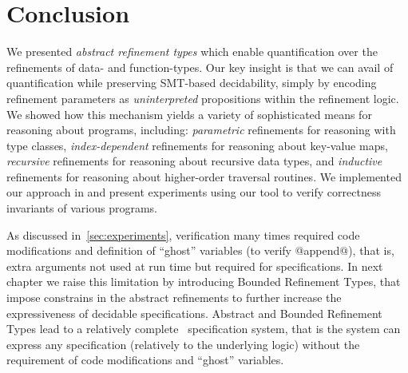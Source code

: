 \section{Conclusion}\label{sec:abstractrefinements:conclusion}
We presented \emph{abstract refinement types} which enable 
quantification over the refinements of data- and 
function-types. Our key insight is that we 
can avail of quantification while preserving SMT-based 
decidability, simply by encoding refinement parameters
as \emph{uninterpreted} propositions within the 
refinement logic.
%
We showed how this mechanism yields a variety 
of sophisticated means for reasoning about programs, including:
\emph{parametric} refinements for reasoning with 
type classes,
\emph{index-dependent} refinements for reasoning about 
key-value maps,
\emph{recursive} refinements for reasoning about 
recursive data types, and
\emph{inductive} refinements for reasoning about 
higher-order traversal routines.
%
We implemented our approach in \toolname and present 
experiments using our tool to verify correctness invariants 
of various programs.

As discussed in~\ref{sec:experiments},
verification many times required code modifications
and definition of ``ghost'' variables (\eg to verify @append@), 
that is, extra arguments not used at run time
but required for specifications.
%
In next chapter we raise this limitation by 
introducing Bounded Refinement Types, 
that impose constrains in the abstract refinements
to further increase the expressiveness of decidable specifications.
%
Abstract and Bounded Refinement Types lead to a relatively complete~\cite{TerauchiPOPL13}
specification system, 
that is the system can express any specification (relatively to the underlying logic)
without the requirement of code modifications and ``ghost'' variables. 
